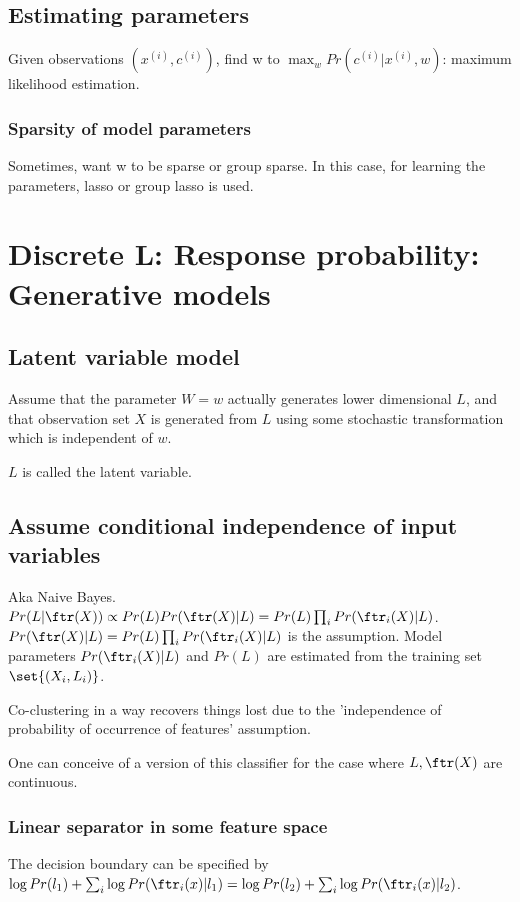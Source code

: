 \documentclass[oneside, article]{memoir}
\begin{document}
\subsection{Estimating parameters}
Given observations $(x^{(i)}, c^{(i)})$, find w to $\max_w Pr(c^{(i)}|x^{(i)}, w)$: maximum likelihood estimation.

\subsubsection{Sparsity of model parameters}
Sometimes, want w to be sparse or group sparse. In this case, for learning the parameters, lasso or group lasso is used.

\section{Discrete L: Response probability: Generative models}
\subsection{Latent variable model}
Assume that the parameter $W = w$ actually generates lower dimensional $L$, and that observation set $X$ is generated from $L$ using some stochastic transformation which is independent of $w$.

$L$ is called the latent variable.

\subsection{Assume conditional independence of input variables}
Aka Naive Bayes. $Pr(L|\ftr(X)) \propto Pr(L) Pr(\ftr(X)|L) = Pr(L) \prod_{i} Pr(\ftr_{i}(X)|L) $. $Pr(\ftr(X)|L) = Pr(L) \prod_{i} Pr(\ftr_{i}(X)|L)$ is the assumption. Model parameters $Pr(\ftr_{i}(X)|L)$ and $Pr(L)$ are estimated from the training set $\set{(X_{i}, L_{i})}$.

Co-clustering in a way recovers things lost due to the 'independence of probability of occurrence of features' assumption.
\tbc

One can conceive of a version of this classifier for the case where $L, \ftr(X)$ are continuous. \oprob

\subsubsection{Linear separator in some feature space}
The decision boundary can be specified by $\log Pr(l_1) + \sum_{i} \log Pr(\ftr_{i}(x)|l_1) =  \log Pr(l_2) + \sum_{i} \log Pr(\ftr_{i}(x)|l_2)$.
\end{document}
